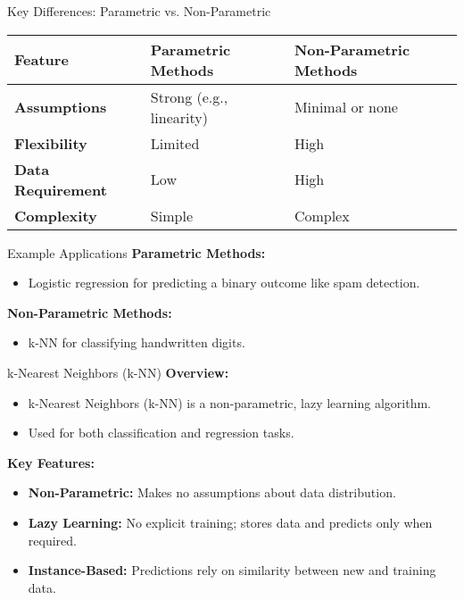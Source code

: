 \documentclass[serif, aspectratio=169]{beamer}
\begin{document}
\begin{frame}{Key Differences: Parametric vs. Non-Parametric}
    \begin{table}[]
        \centering
        \begin{tabular}{|l|l|l|}
        \hline
        \textbf{Feature}         & \textbf{Parametric Methods} & \textbf{Non-Parametric Methods} \\ \hline
        \textbf{Assumptions}     & Strong (e.g., linearity)    & Minimal or none                \\ \hline
        \textbf{Flexibility}     & Limited                    & High                           \\ \hline
        \textbf{Data Requirement}& Low                        & High                           \\ \hline
        \textbf{Complexity}      & Simple                     & Complex                        \\ \hline
        \end{tabular}
    \end{table}
\end{frame}

\begin{frame}{Example Applications}
    \textbf{Parametric Methods:}
    \begin{itemize}
        \item Logistic regression for predicting a binary outcome like spam detection.
    \end{itemize}
    \textbf{Non-Parametric Methods:}
    \begin{itemize}
        \item k-NN for classifying handwritten digits.
    \end{itemize}
\end{frame}

\begin{frame}{k-Nearest Neighbors (k-NN)}
    \textbf{Overview:}
    \begin{itemize}
        \item k-Nearest Neighbors (k-NN) is a non-parametric, lazy learning algorithm.
        \item Used for both classification and regression tasks.
    \end{itemize}

    \textbf{Key Features:}
    \begin{itemize}
        \item \textbf{Non-Parametric:} Makes no assumptions about data distribution.
        \item \textbf{Lazy Learning:} No explicit training; stores data and predicts only when required.
        \item \textbf{Instance-Based:} Predictions rely on similarity between new and training data.
    \end{itemize}
\end{frame}
\end{document}
